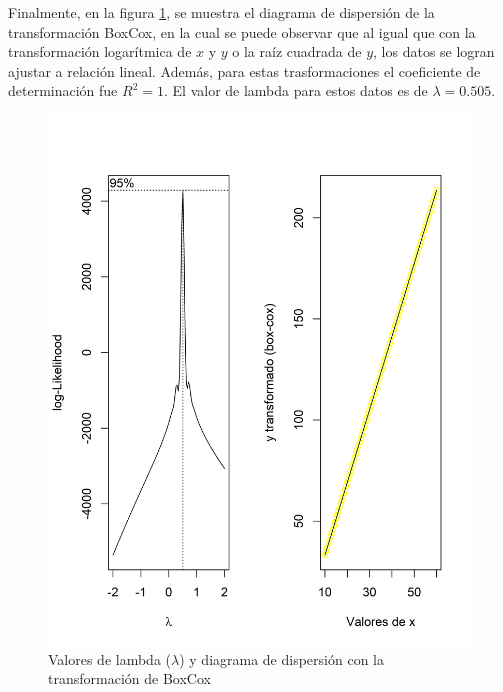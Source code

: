 \documentclass{article}
\begin{document}
Finalmente, en la figura \ref{tbox}, se muestra el diagrama de dispersión de la transformación Box\textendash Cox, en la cual se puede observar que al igual que con la transformación logarítmica de $x$ y $y$ o la raíz cuadrada de $y$, los datos se logran ajustar a relación lineal. Además, para estas trasformaciones el coeficiente de determinación fue $R^2 =1$. El valor de lambda para estos datos es de $\lambda = 0.505$.

\begin{figure}[h]
\centering
\includegraphics[scale=0.5]{Figures/graficabox.png}
\caption{Valores de lambda ($\lambda$) y diagrama de dispersión con la transformación de Box\textendash Cox}
\label{tbox}
\end{figure}

\end{document}
